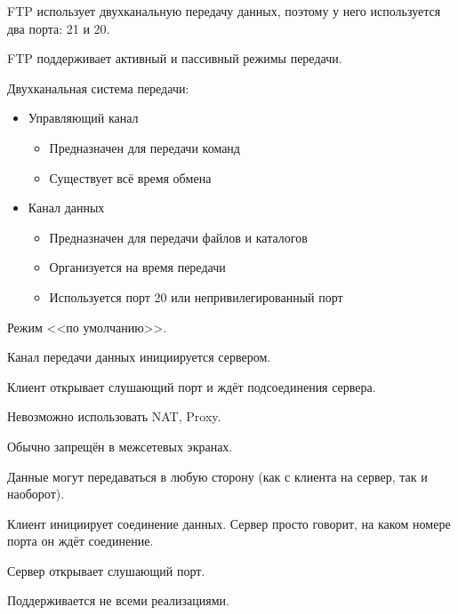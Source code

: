 FTP использует двухканальную передачу данных, поэтому у него используется два порта: 21 и 20.

FTP поддерживает активный и пассивный режимы передачи.

Двухканальная система передачи:
\begin{itemize}
    \item Управляющий канал
    \begin{itemize}
        \item Предназначен для передачи команд
        \item Существует всё время обмена
    \end{itemize}
    \item Канал данных
    \begin{itemize}
        \item Предназначен для передачи файлов и каталогов
        \item Организуется на время передачи
        \item Используется порт 20 или непривилегированный порт
    \end{itemize}
\end{itemize}


Режим <<по умолчанию>>.

Канал передачи данных инициируется сервером.

Клиент открывает слушающий порт и ждёт подсоединения сервера.

Невозможно использовать NAT, Proxy.

Обычно запрещён в межсетевых экранах.

Данные могут передаваться в любую сторону (как с клиента на сервер, так и наоборот).


Клиент инициирует соединение данных. Сервер просто говорит, на каком номере порта он ждёт соединение.

Сервер открывает слушающий порт.

Поддерживается не всеми реализациями.


